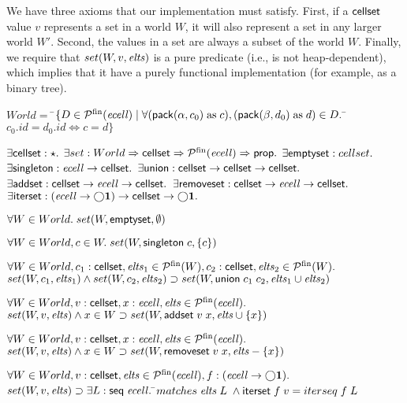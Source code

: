 We have three axioms that our implementation must satisfy. First, if a
$\mathsf{cellset}$ value $v$ represents a set in a world $W$, it will also
represent a set in any larger world $W'$. Second, the values in a set
are always a subset of the world $W$. Finally, we require that
$set(W,v,\mathit{elts})$ is a pure predicate (i.e., is not heap-dependent),
which implies that it have a purely functional implementation (for
example, as a binary tree). 

\begin{specification}
$World = $ \nextline
\;\;\;\;\=$\{D \in \mathcal{P}^{\mathrm{fin}}(\mathit{ecell})\;|\;\forall (\mathsf{pack}({\alpha}, {c_0}) \; \mathrm{as}\; c),(\mathsf{pack}({\beta}, {d_0}) \;\mathrm{as}\; d) \in D.\;$\=$c_0.id = d_0.id \iff c = d\}$\nextline[1em]

$\exists \mathsf{cellset} : \star.$ \nextline
$\exists set : World \Rightarrow \mathsf{cellset} \Rightarrow \mathcal{P}^{\mathrm{fin}}(\mathit{ecell}) \Rightarrow \mathsf{prop}.$ \nextline
$\exists \mathsf{emptyset}    : cellset.$ \nextline
$\exists \mathsf{singleton}   : \mathit{ecell} \to \mathsf{cellset}.$ \nextline
$\exists \mathsf{union}      : \mathsf{cellset} \to \mathsf{cellset} \to \mathsf{cellset}.$ \nextline
$\exists \mathsf{addset}      : \mathsf{cellset} \to \mathit{ecell} \to \mathsf{cellset}.$ \nextline
$\exists \mathsf{removeset}   : \mathsf{cellset} \to \mathit{ecell} \to \mathsf{cellset}.$ \nextline
$\exists \mathsf{iterset}     : (\mathit{ecell} \to \bigcirc{\mathbf{1}}) \to \mathsf{cellset} \to \bigcirc{\mathbf{1}}.$\nextline[1em]

$\forall W \in World.\; set(W, \mathsf{emptyset}, \emptyset)$ \nextline[1em]

$\forall W \in World, c \in W.\; set(W, \mathsf{singleton}\;c, \{{c}\})$ \nextline[1em]

$\forall W \in World, c_1 : \mathsf{cellset}, \mathit{elts}_1 \in \mathcal{P}^{\mathrm{fin}}(W), c_2 : \mathsf{cellset}, \mathit{elts}_2 \in \mathcal{P}^{\mathrm{fin}}(W).$ \nextline
\;\;$set(W, c_1, \mathit{elts}_1) \land set(W, c_2, \mathit{elts}_2) \supset set(W, \mathsf{union}\;c_1\;c_2, \mathit{elts}_1 \cup \mathit{elts}_2)$ \nextline[1em]


$\forall W \in World, v : \mathsf{cellset}, x : \mathit{ecell}, \mathit{elts} \in \mathcal{P}^{\mathrm{fin}}(\mathit{ecell}).$ \nextline 
\> $set(W, v, \mathit{elts}) \land x \in W \supset set(W, \mathsf{addset}\;v\;x, \mathit{elts} \cup \{{x}\})$ \nextline[1em]


$\forall W \in World, v : \mathsf{cellset}, x : \mathit{ecell}, \mathit{elts} \in \mathcal{P}^{\mathrm{fin}}(\mathit{ecell}).$ \nextline 
\> $set(W, v, \mathit{elts}) \land x \in W \supset set(W, \mathsf{removeset}\;v\;x, \mathit{elts} - \{{x}\})$ \nextline[1em]


$\forall W \in World, v : \mathsf{cellset}, \mathit{elts} \in \mathcal{P}^{\mathrm{fin}}(\mathit{ecell}), 
         f : (\mathit{ecell} \to \bigcirc{\mathbf{1}}).$ \nextline 
\> $set(W, v, \mathit{elts}) \supset \exists L : \mathsf{seq}\;{\mathit{ecell}}.\;$\=$matches\;\mathit{elts}\;L\; \land \mathsf{iterset}\;f\;v = iterseq\;f\;L$ \nextline[1em]



\end{specification}
